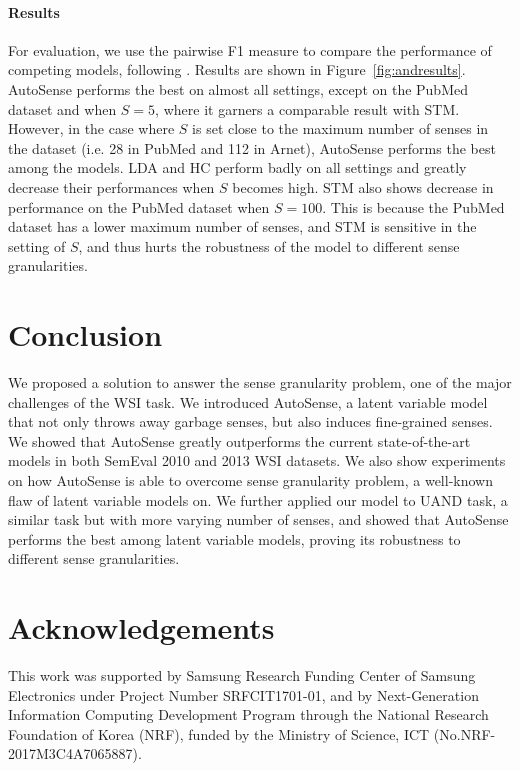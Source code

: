 \documentclass[letterpaper]{article}
\begin{document}
\paragraph{Results}

For evaluation, we use the pairwise F1 measure to compare the performance of competing models, following \cite{tang2012unified}. Results are shown in Figure~\ref{fig:andresults}. AutoSense performs the best on almost all settings, except on the PubMed dataset and when $S=5$, where it garners a comparable result with STM. However, in the case where $S$ is set close to the maximum number of senses in the dataset (i.e. 28 in PubMed and 112 in Arnet), AutoSense performs the best among the models. LDA and HC perform badly on all settings and greatly decrease their performances when $S$ becomes high. STM also shows decrease in performance on the PubMed dataset when $S=100$. This is because the PubMed dataset has a lower maximum number of senses, and STM is sensitive in the setting of $S$, and thus hurts the robustness of the model to different sense granularities.

\section{Conclusion} %

We proposed a solution to answer the sense granularity problem, one of the major challenges of the WSI task. We introduced AutoSense, a latent variable model that not only throws away garbage senses, but also induces fine-grained senses. We showed that AutoSense greatly outperforms the current state-of-the-art models in both SemEval 2010 and 2013 WSI datasets. We also show experiments on how AutoSense is able to overcome sense granularity problem, a well-known flaw of latent variable models on. We further applied our model to UAND task, a similar task but with more varying number of senses, and showed that AutoSense performs the best among latent variable models, proving its robustness to different sense granularities.

\section*{Acknowledgements}

This work was supported by Samsung Research Funding
Center of Samsung Electronics under Project Number SRFCIT1701-01, and by Next-Generation Information Computing Development Program through the National Research Foundation of Korea (NRF), funded by the Ministry of Science, ICT (No.NRF-2017M3C4A7065887).
\end{document}
